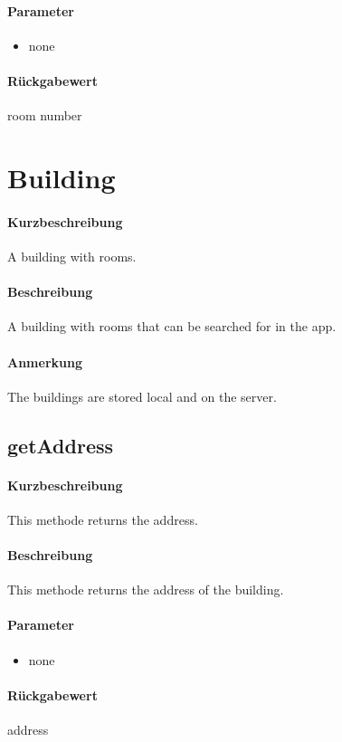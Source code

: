 \paragraph*{Parameter}
\begin{itemize}
    \item none
\end{itemize}
\paragraph*{Rückgabewert}
room number


\section{Building}
\paragraph*{Kurzbeschreibung}
A building with rooms.
\paragraph*{Beschreibung}
A building with rooms that can be searched for in the app.
\paragraph*{Anmerkung}
The buildings are stored local and on the server.

\subsection{getAddress}%
\paragraph*{Kurzbeschreibung}
This methode returns the address.
\paragraph*{Beschreibung}
This methode returns the address of the building.
\paragraph*{Parameter}
\begin{itemize}
    \item none
\end{itemize}
\paragraph*{Rückgabewert}
address

